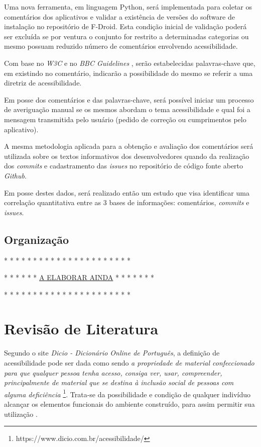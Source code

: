 \documentclass[
	12pt,				%
	oneside,			%
	a4paper,			%
	english,			%
	brazil				%
	]{abntex2ppgsi}
\begin{document}
Uma nova ferramenta, em linguagem Python, será implementada para coletar os comentários dos aplicativos e validar a existência de versões do software de instalação no repositório de F-Droid. Esta condição inicial de validação poderá ser excluída se por ventura o conjunto for restrito a determinadas categorias ou mesmo possuam reduzido número de comentários envolvendo acessibilidade.

Com base no \textit{W3C} \cite{wcag} e no \textit{BBC Guidelines} \cite{bbc}, serão estabelecidas palavras-chave que, em existindo no comentário, indicarão a possibilidade do mesmo se referir a uma diretriz de acessibilidade.

Em posse dos comentários e das palavras-chave, será possível iniciar um processo de averiguação manual se os mesmos abordam o tema acessibilidade e qual foi a mensagem transmitida pelo usuário (pedido de correção ou cumprimentos pelo aplicativo).

A mesma metodologia aplicada para a obtenção e avaliação dos comentários será utilizada sobre os textos informativos dos desenvolvedores quando da realização dos \textit{commits} e cadastramento das \textit{issues} no repositório de código fonte aberto \textit{Github}.

Em posse destes dados, será realizado então um estudo que visa identificar uma correlação quantitativa entre as 3 bases de informações: comentários, \textit{commits} e \textit{issues}.


\section{Organização}
* * * * * * * * * * * * * * * * * * * * * * 

* * * * * * \underline{A ELABORAR AINDA} * * * * * * *

* * * * * * * * * * * * * * * * * * * * * * 


\chapter{Revisão de Literatura}

Segundo o site \textit{Dicio - Dicionário Online de Português}, a definição de acessibilidade pode ser dada como sendo \textit{a propriedade de material confeccionado para que qualquer pessoa tenha acesso, consiga ver, usar, compreender, principalmente de material que se destina à inclusão social de pessoas com alguma deficiência} \footnote{https://www.dicio.com.br/acessibilidade/}. Trata-se da possibilidade e condição de qualquer indivíduo alcançar os elementos funcionais do ambiente construído, para assim permitir sua utilização \cite{camilamaster}.
\end{document}
